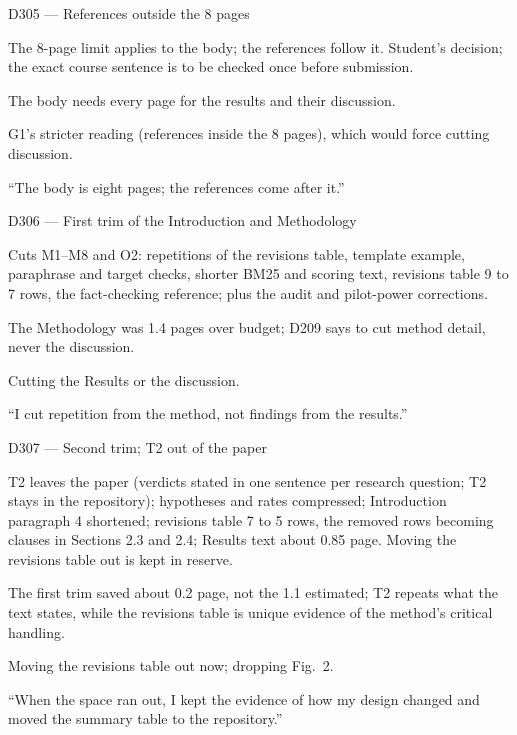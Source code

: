 \documentclass[11pt,a4paper]{report}
\begin{document}
\begin{decisionbox}{D305 --- References outside the 8 pages}
\begin{description}[nosep, leftmargin=0pt]
  \item[Decision.] The 8-page limit applies to the body; the references follow it. Student's decision; the exact course sentence is to be checked once before submission.
  \item[Why.] The body needs every page for the results and their discussion.
  \item[Alternatives.] G1's stricter reading (references inside the 8 pages), which would force cutting discussion.
  \item[Interview line.] ``The body is eight pages; the references come after it.''
\end{description}
\end{decisionbox}

\begin{decisionbox}{D306 --- First trim of the Introduction and Methodology}
\begin{description}[nosep, leftmargin=0pt]
  \item[Decision.] Cuts M1--M8 and O2: repetitions of the revisions table, template example, paraphrase and target checks, shorter BM25 and scoring text, revisions table 9 to 7 rows, the fact-checking reference; plus the audit and pilot-power corrections.
  \item[Why.] The Methodology was 1.4 pages over budget; D209 says to cut method detail, never the discussion.
  \item[Alternatives.] Cutting the Results or the discussion.
  \item[Interview line.] ``I cut repetition from the method, not findings from the results.''
\end{description}
\end{decisionbox}

\begin{decisionbox}{D307 --- Second trim; T2 out of the paper}
\begin{description}[nosep, leftmargin=0pt]
  \item[Decision.] T2 leaves the paper (verdicts stated in one sentence per research question; T2 stays in the repository); hypotheses and rates compressed; Introduction paragraph 4 shortened; revisions table 7 to 5 rows, the removed rows becoming clauses in Sections 2.3 and 2.4; Results text about 0.85 page. Moving the revisions table out is kept in reserve.
  \item[Why.] The first trim saved about 0.2 page, not the 1.1 estimated; T2 repeats what the text states, while the revisions table is unique evidence of the method's critical handling.
  \item[Alternatives.] Moving the revisions table out now; dropping Fig.~2.
  \item[Interview line.] ``When the space ran out, I kept the evidence of how my design changed and moved the summary table to the repository.''
\end{description}
\end{decisionbox}
\end{document}
